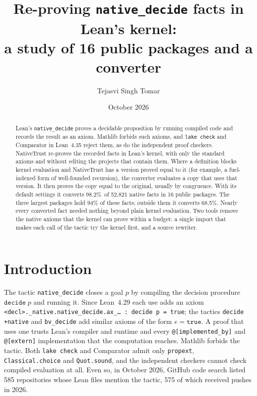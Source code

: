 \documentclass[11pt]{article}
\title{Re-proving \texttt{native\_decide} facts in Lean's kernel:\\
a study of 16 public packages and a converter}
\author{Tejasvi Singh Tomar}
\date{October 2026}
\newcommand{\vtotrate}{98.2\%}   %
\newcommand{\vwoToprate}{68.5\%}   %
\begin{document}
\maketitle

\begin{abstract}
Lean's \texttt{native\_decide} proves a decidable proposition by running compiled code and records the result
as an axiom. Mathlib forbids such axioms, and \texttt{lake check} and Comparator in Lean~4.35 reject them, as do
the independent proof checkers. NativeTrust re-proves the recorded facts in Lean's kernel, with only the
standard axioms and without editing the projects that contain them. Where a definition blocks kernel evaluation
and NativeTrust has a version proved equal to it (for example, a fuel-indexed form of well-founded recursion),
the converter evaluates a copy that uses that version. It then proves the copy equal to the original, usually by
congruence. With its default
settings it converts \vtotrate\ of 52,821 native facts in 16 public packages. The three largest packages hold
94\% of these facts; outside them it converts \vwoToprate. Nearly every converted fact needed nothing beyond
plain kernel evaluation. Two tools remove the native axioms that the kernel can prove within a budget: a
single import that makes each call of the tactic try the kernel first, and a source rewriter.
\end{abstract}

\section{Introduction}\label{sec:intro}

The tactic \texttt{native\_decide} closes a goal \(p\) by compiling the decision procedure
\(\mathtt{decide}\;p\) and running it. Since Lean~4.29 each use adds an axiom
\texttt{<decl>.\allowbreak\_native.\allowbreak native\_decide.\allowbreak ax\_\ldots{} : decide~p~=~true}; the tactics \texttt{decide +native} and
\texttt{bv\_decide} add similar axioms of the form \(e = \mathtt{true}\). A proof that uses one trusts Lean's compiler and
runtime and every \verb|@[implemented_by]| and \verb|@[extern]| implementation that the
computation reaches. Mathlib forbids the tactic. Both \texttt{lake check} and Comparator admit only
\texttt{propext}, \texttt{Classical.choice} and \texttt{Quot.sound}, and the independent checkers
cannot check compiled evaluation at all. Even so, in October 2026, GitHub code search listed 585
repositories whose Lean files mention the tactic, 575 of which received pushes in 2026.
\end{document}
